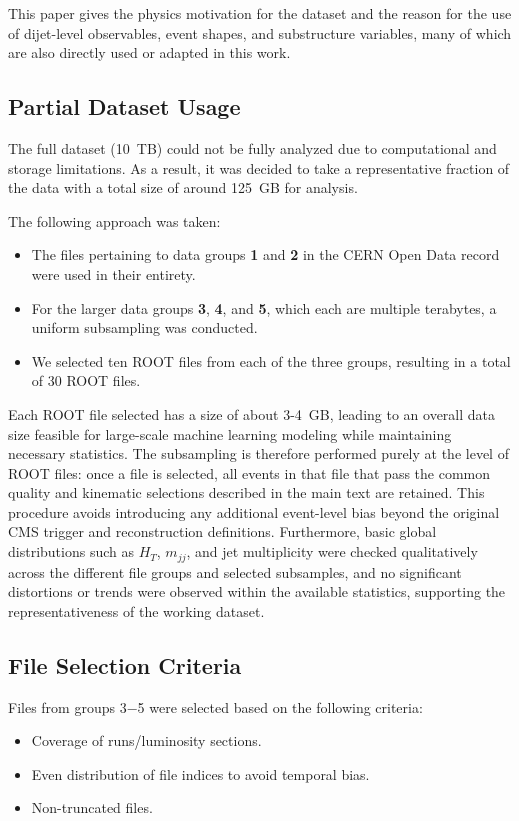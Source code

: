 \documentclass[11pt,a4paper,twocolumn]{article}
\begin{document}
This paper gives the physics motivation for the dataset and the reason for the use of dijet-level observables, event shapes, and substructure variables, many of which are also directly used or adapted in this work.

\subsection{Partial Dataset Usage}

The full dataset (10~TB) could not be fully analyzed due to computational and storage limitations.
As a result, it was decided to take a representative fraction of the data with a total size of around 125~GB for analysis.

The following approach was taken:
\begin{itemize}
    \item The files pertaining to data groups \textbf{1} and \textbf{2} in the CERN Open Data record were used in their entirety. 
    \item For the larger data groups \textbf{3}, \textbf{4}, and \textbf{5}, which each are multiple terabytes, a uniform subsampling was conducted. 
    \item We selected ten ROOT files from each of the three groups, resulting in a total of 30 ROOT files.
\end{itemize}

Each ROOT file selected has a size of about 3-4~GB, leading to an overall data size feasible for large-scale machine learning modeling while maintaining necessary statistics. The subsampling is therefore performed purely at the level of ROOT files: once a file is selected, all events in that file that pass the common quality and kinematic selections described in the main text are retained. This procedure avoids introducing any additional event-level bias beyond the original CMS trigger and reconstruction definitions. Furthermore, basic global distributions such as $H_T$, $m_{jj}$, and jet multiplicity were checked qualitatively across the different file groups and selected subsamples, and no significant distortions or trends were observed within the available statistics, supporting the representativeness of the working dataset.

\subsection{File Selection Criteria}

Files from groups 3$-$5 were selected based on the following criteria: 
\begin{itemize}
    \item Coverage of runs/luminosity sections.
    \item Even distribution of file indices to avoid temporal bias.
    \item Non-truncated files.
\end{itemize}
\end{document}
